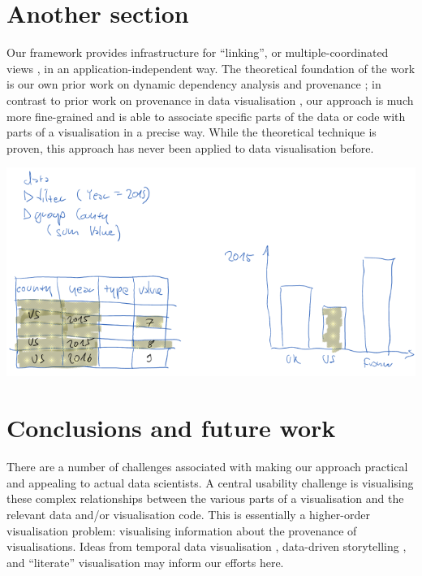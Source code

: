 \documentclass{vgtc}
\begin{document}

\section{Another section}

Our framework provides infrastructure for ``linking'', or multiple-coordinated
views \cite{tobiasz09}, in an application-independent way. The theoretical
foundation of the work is our own prior work on dynamic dependency analysis and
provenance \cite{perera16d, ricciotti17}; in contrast to prior work on
provenance in data visualisation \cite{callahan06}, our approach is much more
fine-grained and is able to associate specific parts of the data or code with
parts of a visualisation in a precise way. While the theoretical technique is
proven, this approach has never been applied to data visualisation before.

\includegraphics[scale=0.35]{image/chart-bwd}

\section{Conclusions and future work}

There are a number of challenges associated with making our approach practical
and appealing to actual data scientists. A central usability challenge is
visualising these complex relationships between the various parts of a
visualisation and the relevant data and/or visualisation code. This is
essentially a higher-order visualisation problem: visualising information about
the provenance of visualisations. Ideas from temporal data visualisation
\cite{bach16}, data-driven storytelling \cite{bach18}, and ``literate''
visualisation \cite{wood19} may inform our efforts here.

\acknowledgments{}


\end{document}
